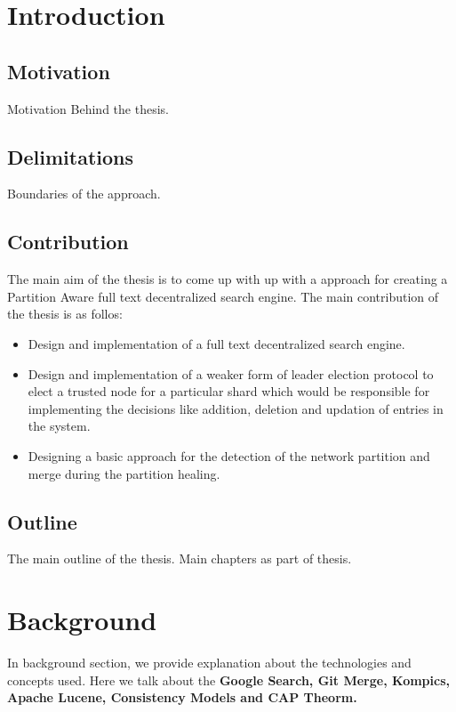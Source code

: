 \documentclass[a4paper, 11pt]{article}
\begin{document}
\section{Introduction}

\subsection{Motivation}
Motivation Behind the thesis.

\subsection{Delimitations}
Boundaries of the approach.

\subsection{Contribution}
The main aim of the thesis is to come up with up with a approach for creating a Partition Aware full text decentralized search engine. The main contribution of the thesis is as follos:

\begin{itemize}
	\item Design and implementation of a full text decentralized search engine.
	\item Design and implementation of a weaker form of leader election protocol to elect a trusted node for a particular shard which would be responsible for implementing the decisions like addition, deletion and updation of entries in the system.
	\item Designing a basic approach for the detection of the network partition and merge during the partition healing.
		
\end{itemize}

\subsection{Outline}
The main outline of the thesis. Main chapters as part of thesis.


\newpage
\section{Background}
In background section, we provide explanation about the technologies and concepts used. Here we talk about the \textbf{Google Search, Git Merge, Kompics, Apache Lucene, Consistency Models and CAP Theorm.}
\end{document}
